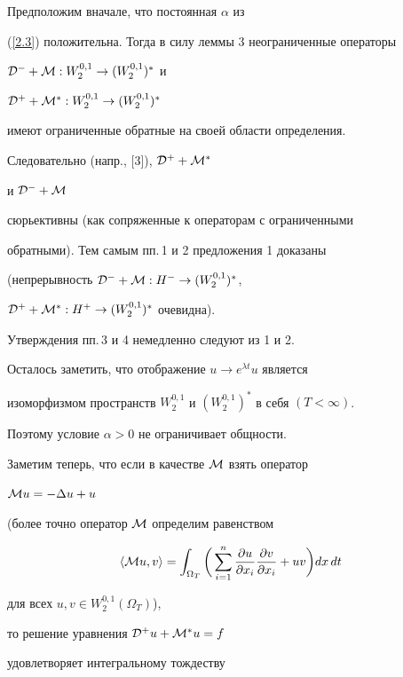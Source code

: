 \begin{pf} 


Предположим вначале, что постоянная $\alpha$ из


(\ref{2.3}) положительна. Тогда в силу леммы 3 неограниченные операторы


${\cal D}^{-}+{\cal M}:W_2^{0,1} \to (W_2^{0,1})^*$ и


${\cal D}^{+}+{\cal M}^{*}:W_2^{0,1} \to (W_2^{0,1})^*$


имеют ограниченные обратные на своей области определения.


Следовательно (напр., [3]), ${\cal D}^{+}+{\cal M}^{*}$


и ${\cal D}^{-}+{\cal M} $


сюрьективны (как сопряженные к операторам с ограниченными


обратными). Тем самым пп.\,1 и 2 предложения 1 доказаны


(непрерывность ${\cal D}^{-}+{\cal M}:H^{-}\to (W_2^{0,1})^{*}$,


${\cal D}^{+}+{\cal M}^{*}:H^{+}\to (W_2^{0,1})^{*}$ очевидна).


Утверждения пп.\,3 и 4 немедленно следуют из 1 и 2.


Осталось заметить, что отображение $u\to e^{\lambda t} u$ является 


изоморфизмом пространств $W_2^{0,1}$ и $(W_2^{0,1})^{*}$ в себя $(T<\infty)$.


Поэтому условие $\alpha>0$ не ограничивает общности.


\end{pf}


 


Заметим теперь, что если в качестве ${\cal M}$ взять оператор


${\cal M}u=-\Delta u + u$


(более точно оператор ${\cal M}$ определим равенством


$$


\la {\cal M}u,v \ra =


\int_{\Omega_T} \bigg(\sum_{i=1}^n \frac{\partial u}{\partial x_i}


\frac{\partial v}{\partial x_i}+uv \bigg)dx\,dt


$$


для всех $u,v \in W_2^{0,1}(\Omega_T)$),


то решение уравнения ${\cal D}^{+}u+{\cal M}^{*}u=f$


удовлетворяет интегральному тождеству


